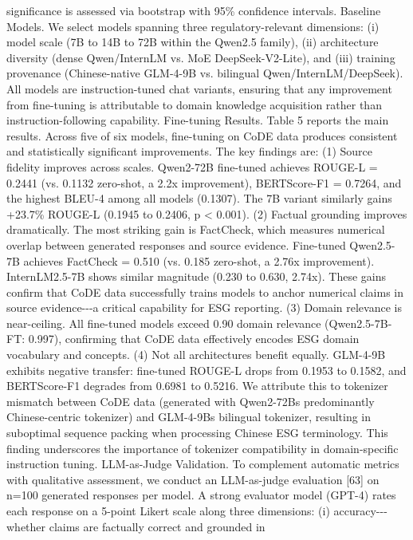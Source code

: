 \documentclass[9pt,twocolumn]{extarticle}
\begin{document}
significance is assessed via bootstrap with 95\% confidence intervals.
Baseline Models. We select models spanning three regulatory-relevant
dimensions: (i) model scale (7B to 14B to 72B within the Qwen2.5
family), (ii) architecture diversity (dense Qwen/InternLM vs. MoE
DeepSeek-V2-Lite), and (iii) training provenance (Chinese-native
GLM-4-9B vs. bilingual Qwen/InternLM/DeepSeek). All models are
instruction-tuned chat variants, ensuring that any improvement from
fine-tuning is attributable to domain knowledge acquisition rather than
instruction-following capability.
Fine-tuning Results. Table 5 reports the main results. Across five of
six models, fine-tuning on CoDE data produces consistent and
statistically significant improvements. The key findings are:
(1) Source fidelity improves across scales. Qwen2-72B fine-tuned
achieves ROUGE-L = 0.2441 (vs. 0.1132 zero-shot, a 2.2x improvement),
BERTScore-F1 = 0.7264, and the highest BLEU-4 among all models (0.1307).
The 7B variant similarly gains +23.7\% ROUGE-L (0.1945 to 0.2406, p
\textless{} 0.001).
(2) Factual grounding improves dramatically. The most striking gain is
FactCheck, which measures numerical overlap between generated responses
and source evidence. Fine-tuned Qwen2.5-7B achieves FactCheck = 0.510
(vs. 0.185 zero-shot, a 2.76x improvement). InternLM2.5-7B shows similar
magnitude (0.230 to 0.630, 2.74x). These gains confirm that CoDE data
successfully trains models to anchor numerical claims in source
evidence-\/-\/-a critical capability for ESG reporting.
(3) Domain relevance is near-ceiling. All fine-tuned models exceed 0.90
domain relevance (Qwen2.5-7B-FT: 0.997), confirming that CoDE data
effectively encodes ESG domain vocabulary and concepts.
(4) Not all architectures benefit equally. GLM-4-9B exhibits negative
transfer: fine-tuned ROUGE-L drops from 0.1953 to 0.1582, and
BERTScore-F1 degrades from 0.6981 to 0.5216. We attribute this to
tokenizer mismatch between CoDE data (generated with
Qwen2-72B\textquotesingle s predominantly Chinese-centric tokenizer) and
GLM-4-9B\textquotesingle s bilingual tokenizer, resulting in suboptimal
sequence packing when processing Chinese ESG terminology. This finding
underscores the importance of tokenizer compatibility in domain-specific
instruction tuning.
LLM-as-Judge Validation. To complement automatic metrics with
qualitative assessment, we conduct an LLM-as-judge evaluation [63]
on n=100 generated responses per model. A strong evaluator model (GPT-4)
rates each response on a 5-point Likert scale along three dimensions:
(i) accuracy-\/-\/-whether claims are factually correct and grounded in
\end{document}
